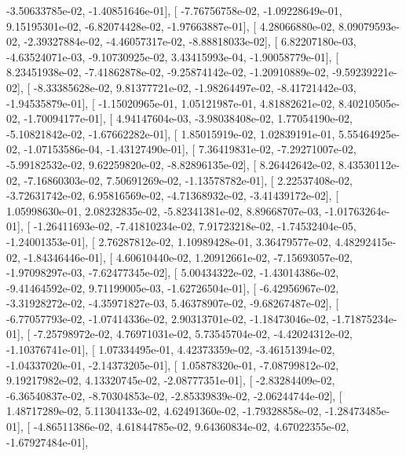 \documentclass{article}
\begin{document}
         -3.50633785e-02,  -1.40851646e-01],
       [ -7.76756758e-02,  -1.09228649e-01,   9.15195301e-02,
         -6.82074428e-02,  -1.97663887e-01],
       [  4.28066880e-02,   8.09079593e-02,  -2.39327884e-02,
         -4.46057317e-02,  -8.88818033e-02],
       [  6.82207180e-03,  -4.63524071e-03,  -9.10730925e-02,
          3.43415993e-04,  -1.90058779e-01],
       [  8.23451938e-02,  -7.41862878e-02,  -9.25874142e-02,
         -1.20910889e-02,  -9.59239221e-02],
       [ -8.33385628e-02,   9.81377721e-02,  -1.98264497e-02,
         -8.41721442e-03,  -1.94535879e-01],
       [ -1.15020965e-01,   1.05121987e-01,   4.81882621e-02,
          8.40210505e-02,  -1.70094177e-01],
       [  4.94147604e-03,  -3.98038408e-02,   1.77054190e-02,
         -5.10821842e-02,  -1.67662282e-01],
       [  1.85015919e-02,   1.02839191e-01,   5.55464925e-02,
         -1.07153586e-04,  -1.43127490e-01],
       [  7.36419831e-02,  -7.29271007e-02,  -5.99182532e-02,
          9.62259820e-02,  -8.82896135e-02],
       [  8.26442642e-02,   8.43530112e-02,  -7.16860303e-02,
          7.50691269e-02,  -1.13578782e-01],
       [  2.22537408e-02,  -3.72631742e-02,   6.95816569e-02,
         -4.71368932e-02,  -3.41439172e-02],
       [  1.05998630e-01,   2.08232835e-02,  -5.82341381e-02,
          8.89668707e-03,  -1.01763264e-01],
       [ -1.26411693e-02,  -7.41810234e-02,   7.91723218e-02,
         -1.74532404e-05,  -1.24001353e-01],
       [  2.76287812e-02,   1.10989428e-01,   3.36479577e-02,
          4.48292415e-02,  -1.84346446e-01],
       [  4.60610440e-02,   1.20912661e-02,  -7.15693057e-02,
         -1.97098297e-03,  -7.62477345e-02],
       [  5.00434322e-02,  -1.43014386e-02,  -9.41464592e-02,
          9.71199005e-03,  -1.62726504e-01],
       [ -6.42956967e-02,  -3.31928272e-02,  -4.35971827e-03,
          5.46378907e-02,  -9.68267487e-02],
       [ -6.77057793e-02,  -1.07414336e-02,   2.90313701e-02,
         -1.18473046e-02,  -1.71875234e-01],
       [ -7.25798972e-02,   4.76971031e-02,   5.73545704e-02,
         -4.42024312e-02,  -1.10376741e-01],
       [  1.07334495e-01,   4.42373359e-02,  -3.46151394e-02,
         -1.04337020e-01,  -2.14373205e-01],
       [  1.05878320e-01,  -7.08799812e-02,   9.19217982e-02,
          4.13320745e-02,  -2.08777351e-01],
       [ -2.83284409e-02,  -6.36540837e-02,  -8.70304853e-02,
         -2.85339839e-02,  -2.06244744e-02],
       [  1.48717289e-02,   5.11304133e-02,   4.62491360e-02,
         -1.79328858e-02,  -1.28473485e-01],
       [ -4.86511386e-02,   4.61844785e-02,   9.64360834e-02,
          4.67022355e-02,  -1.67927484e-01],
\end{document}

